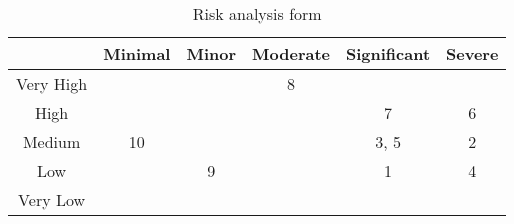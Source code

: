 \begin{table}[H]
    \centering
        \begin{tabular}{| c | c | c | c | c | c |} 
            \hline
            \cellcolor[HTML]{AFAFAF} & Minimal & Minor & 
                                       Moderate & Significant & 
                                       Severe    \\  
            \hline\hline
            Very High  &    \cellcolor[HTML]{FFEA00} & \cellcolor[HTML]{FFEA00} & 
                            \cellcolor[HTML]{FF0004} 8 & \cellcolor[HTML]{FF0004} &
                            \cellcolor[HTML]{FF0004}  \\ 
            \hline
            High       &    \cellcolor[HTML]{FFEA00} & \cellcolor[HTML]{FFEA00} & 
                            \cellcolor[HTML]{FFEA00} & \cellcolor[HTML]{FF0004} 7 & 
                            \cellcolor[HTML]{FF0004} 6 \\
            \hline
            Medium     &    \cellcolor[HTML]{00FF1D} 10& \cellcolor[HTML]{FFEA00} & 
                            \cellcolor[HTML]{FFEA00} & \cellcolor[HTML]{FFEA00} 3, 5 &
                            \cellcolor[HTML]{FF0004} 2 \\
            \hline
            Low        &    \cellcolor[HTML]{00FF1D} & \cellcolor[HTML]{00FF1D} 9 & 
                            \cellcolor[HTML]{FFEA00} & \cellcolor[HTML]{FFEA00} 1 & 
                            \cellcolor[HTML]{FFEA00} 4 \\
            \hline
            Very Low   &    \cellcolor[HTML]{00FF1D} & \cellcolor[HTML]{00FF1D} & 
                            \cellcolor[HTML]{00FF1D} & \cellcolor[HTML]{FFEA00} & 
                            \cellcolor[HTML]{FFEA00}  \\ [1ex]
            \hline
        \end{tabular}
    \caption{Risk analysis form}
    \label{riskForm}
\end{table}